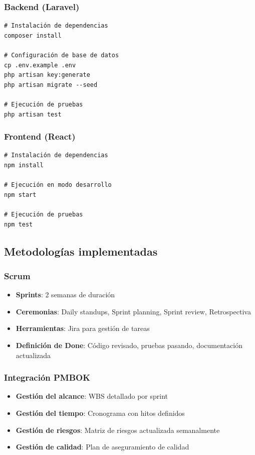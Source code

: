 \subsubsection{Backend (Laravel)}
\begin{verbatim}
# Instalación de dependencias
composer install

# Configuración de base de datos
cp .env.example .env
php artisan key:generate
php artisan migrate --seed

# Ejecución de pruebas
php artisan test
\end{verbatim}

\subsubsection{Frontend (React)}
\begin{verbatim}
# Instalación de dependencias
npm install

# Ejecución en modo desarrollo
npm start

# Ejecución de pruebas
npm test
\end{verbatim}

\subsection{Metodologías implementadas}

\subsubsection{Scrum}
\begin{itemize}[leftmargin=*]
  \item \textbf{Sprints}: 2 semanas de duración
  \item \textbf{Ceremonias}: Daily standups, Sprint planning, Sprint review, Retrospectiva
  \item \textbf{Herramientas}: Jira para gestión de tareas
  \item \textbf{Definición de Done}: Código revisado, pruebas pasando, documentación actualizada
\end{itemize}

\subsubsection{Integración PMBOK}
\begin{itemize}[leftmargin=*]
  \item \textbf{Gestión del alcance}: WBS detallado por sprint
  \item \textbf{Gestión del tiempo}: Cronograma con hitos definidos
  \item \textbf{Gestión de riesgos}: Matriz de riesgos actualizada semanalmente
  \item \textbf{Gestión de calidad}: Plan de aseguramiento de calidad
\end{itemize}

